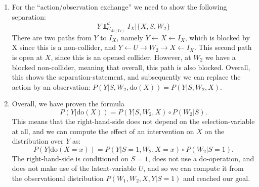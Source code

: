 \begin{enumerate}
\begin{gradedsolution}
\begin{enumerate}
    For step 2, we first use the definition of the conditional Markov kernel to obtain
    \begin{equation*}
      P(Y, W_2 | S, \text{do}(X)) = P(Y | S, W_2, \text{do}(X)) \otimes P(W_2 | S, \text{do}(X)).
    \end{equation*}
    Thus, we need to show the ``deletion of action'' $P(W_2 | S, \text{do}(X)) = P(W_2 | S)$ to be done.
    This means we need to show the separation statement
    \begin{equation*}
      W_2 \Perp_{G_{\text{do}(I_X)}}^d I_X | S.
    \end{equation*}
    The two paths from $W_2$ to $I_X$ are $W_2 \rightarrow X \leftarrow I_X$, which is d-blocked by $S$ due to the collider at $X$, and $W_2 \leftarrow U \rightarrow Y \leftarrow X \leftarrow I_X$, which is now open at $X$, but d-blocked by $S$ at $Y$, since this is a collider.
    Overall, this was to show.

    For step 3, one can directly apply Remark \ref*{rem:markov-kernel-product-and-composition} from the lecture notes on the connection between product Markov kernels and compositions of Markov kernels.
    \item For the ``action/observation exchange'' we need to show the following separation:
    \begin{equation*}
      Y \Perp_{G_{\text{do}(I_X)}}^d I_X | \{X, S, W_2\}
    \end{equation*}
    There are two paths from $Y$ to $I_X$, namely $Y \leftarrow X \leftarrow I_X$, which is blocked by X since this is a non-collider, and $Y \leftarrow U \rightarrow W_2 \rightarrow X \leftarrow I_X$.
    This second path is open at $X$, since this is an opened collider. However, at $W_2$ we have a blocked non-collider, meaning that overall, this path is also blocked.
    Overall, this shows the separation-statement, and subsequently we can replace the action by an observation: $P(Y | S, W_2, \text{do}(X)) = P(Y | S, W_2, X) $.
    \item Overall, we have proven the formula 
    \begin{equation*}
      P(Y | \text{do}(X)) = P(Y | S, W_2, X) \circ P(W_2 | S).
    \end{equation*}
    This means that the right-hand-side does not depend on the selection-variable at all, and we can compute the effect of an intervention on $X$ on the distribution over $Y$ as:
    \begin{equation*}
      P(Y | \text{do}(X = x)) = P(Y | S = 1, W_2, X = x) \circ P(W_2 | S = 1).
    \end{equation*}
    The right-hand-side is conditioned on $S=1$, does not use a do-operation, and does not make use of the latent-variable $U$, and so we can compute it from the observational distribution $P(W_1, W_2, X, Y | S=1)$ and reached our goal.
	\end{enumerate}
\end{gradedsolution}
\end{enumerate}

